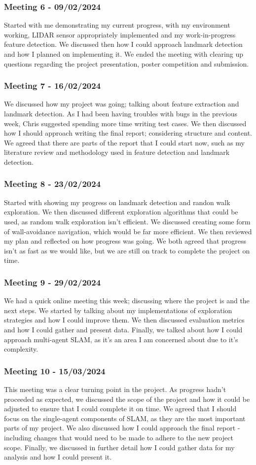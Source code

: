 \documentclass[12pt]{article}
\begin{document}
\subsubsection{Meeting 6 - 09/02/2024}
Started with me demonstrating my current progress, with my environment working, LIDAR sensor appropriately implemented and
my work-in-progress feature detection. We discussed then how I could approach landmark detection and how I planned on implementing
it. We ended the meeting with clearing up questions regarding the project presentation, poster competition and submission.
\subsubsection{Meeting 7 - 16/02/2024}
We discussed how my project was going; talking about feature extraction and landmark detection. As I had been having troubles
with bugs in the previous week, Chris suggested spending more time writing test cases. We then discussed how I should approach
writing the final report; considering structure and content. We agreed that there are parts of the report that I could start
now, such as my literature review and methodology used in feature detection and landmark detection.
\subsubsection{Meeting 8 - 23/02/2024}
Started with showing my progress on landmark detection and randon walk exploration. We then discussed different exploration
algorithms that could be used, as random walk exploration isn't efficient. We discussed creating some form of wall-avoidance
navigation, which would be far more efficient. We then reviewed my plan and reflected on how progress was going. We both
agreed that progress isn't as fast as we would like, but we are still on track to complete the project on time.
\subsubsection{Meeting 9 - 29/02/2024}
We had a quick online meeting this week; discussing where the project is and the next steps. We started by talking about
my implementations of exploration strategies and how I could improve them. We then discussed evaluation metrics and how I
could gather and present data. Finally, we talked about how I could approach multi-agent SLAM, as it's an area I am concerned
about due to it's complexity.
\subsubsection{Meeting 10 - 15/03/2024}
This meeting was a clear turning point in the project. As progress hadn't proceeded as expected, we discussed the scope of
the project and how it could be adjusted to ensure that I could complete it on time. We agreed that I should focus on the single-agent
components of SLAM, as they are the most important parts of my project. We also discussed how I could approach the final report -
including changes that would need to be made to adhere to the new project scope. Finally, we discussed in further detail how I could
gather data for my analysis and how I could present it.
\end{document}
